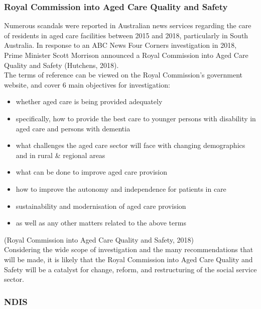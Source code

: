 \documentclass[
  11pt,
]{article}
\providecommand{\tightlist}{%
  \setlength{\itemsep}{0pt}\setlength{\parskip}{0pt}}
\begin{document}
\newpage

\hypertarget{royal-commission-into-aged-care-quality-and-safety}{%
\subsubsection{Royal Commission into Aged Care Quality and Safety}\label{royal-commission-into-aged-care-quality-and-safety}}

Numerous scandals were reported in Australian news services regarding the care of residents in aged care facilities between 2015 and 2018, particularly in South Australia. In response to an ABC News Four Corners investigation in 2018, Prime Minister Scott Morrison announced a Royal Commission into Aged Care Quality and Safety (Hutchens, 2018).\\
The terms of reference can be viewed on the Royal Commission's government website, and cover 6 main objectives for investigation:

\begin{itemize}
\tightlist
\item
  whether aged care is being provided adequately
\item
  specifically, how to provide the best care to younger persons with disability in aged care and persons with dementia
\item
  what challenges the aged care sector will face with changing demographics and in rural \& regional areas
\item
  what can be done to improve aged care provision
\item
  how to improve the autonomy and independence for patients in care
\item
  sustainability and modernisation of aged care provision
\item
  as well as any other matters related to the above terms
\end{itemize}

(Royal Commission into Aged Care Quality and Safety, 2018)\\
Considering the wide scope of investigation and the many recommendations that will be made, it is likely that the Royal Commission into Aged Care Quality and Safety will be a catalyst for change, reform, and restructuring of the social service sector.

\newpage

\hypertarget{ndis}{%
\subsubsection{NDIS}\label{ndis}}
\end{document}
